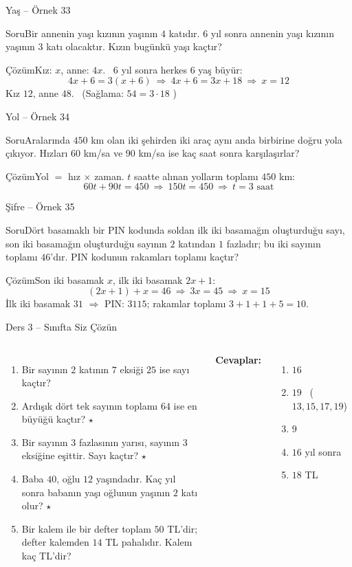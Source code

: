 \documentclass[aspectratio=169,11pt]{beamer}
\newcommand{\soru}[3]{%
\begin{frame}{#1}
  \begin{block}{Soru}\large #2\end{block}
  \pause
  \begin{exampleblock}{Çözüm}\large #3\end{exampleblock}
\end{frame}}
\begin{document}
\soru{Yaş -- Örnek 33}
{Bir annenin yaşı kızının yaşının \(4\) katıdır. \(6\) yıl sonra annenin yaşı kızının yaşının \(3\) katı olacaktır. Kızın bugünkü yaşı kaçtır?}
{Kız: \(x\), anne: \(4x\). \ \(6\) yıl sonra herkes \(6\) yaş büyür:
\[4x+6=3(x+6)\ \Rightarrow\ 4x+6=3x+18\ \Rightarrow\ x=12\]
Kız \(12\), anne \(48\). \ (Sağlama: \(54=3\cdot 18\) \checkmark)}

\soru{Yol -- Örnek 34}
{Aralarında \(450\) km olan iki şehirden iki araç aynı anda birbirine doğru yola çıkıyor. Hızları \(60\) km/sa ve \(90\) km/sa ise kaç saat sonra karşılaşırlar?}
{Yol \(=\) hız \(\times\) zaman. \(t\) saatte alınan yolların toplamı \(450\) km:
\[60t+90t=450\ \Rightarrow\ 150t=450\ \Rightarrow\ t=3 \text{ saat}\]}

\soru{Şifre -- Örnek 35}
{Dört basamaklı bir PIN kodunda soldan ilk iki basamağın oluşturduğu sayı, son iki basamağın oluşturduğu sayının \(2\) katından \(1\) fazladır; bu iki sayının toplamı \(46\)'dır. PIN kodunun rakamları toplamı kaçtır?}
{Son iki basamak \(x\), ilk iki basamak \(2x+1\):
\[(2x+1)+x=46\ \Rightarrow\ 3x=45\ \Rightarrow\ x=15\]
İlk iki basamak \(31\) \(\Rightarrow\) PIN: \(3115\); rakamlar toplamı \(3+1+1+5=10\).}

\begin{frame}{Ders 3 -- Sınıfta Siz Çözün}
\begin{columns}[t]
\begin{enumerate}
\item Bir sayının \(2\) katının \(7\) eksiği \(25\) ise sayı kaçtır?
\item Ardışık dört tek sayının toplamı \(64\) ise en büyüğü kaçtır? \(\star\)
\item Bir sayının \(3\) fazlasının yarısı, sayının \(3\) eksiğine eşittir. Sayı kaçtır? \(\star\)
\item Baba \(40\), oğlu \(12\) yaşındadır. Kaç yıl sonra babanın yaşı oğlunun yaşının \(2\) katı olur? \(\star\)
\item Bir kalem ile bir defter toplam \(50\) TL'dir; defter kalemden \(14\) TL pahalıdır. Kalem kaç TL'dir?
\end{enumerate}
\pause
\textbf{Cevaplar:}
\begin{enumerate}
\item \(16\)\\[8pt]
\item \(19\) \ (\(13,15,17,19\))\\[8pt]
\item \(9\)\\[8pt]
\item \(16\) yıl sonra\\[8pt]
\item \(18\) TL
\end{enumerate}
\end{columns}
\vspace{4pt}{\footnotesize \(\star\) işaretli soruların adım adım çözümü sonraki slaytlardadır.}
\end{frame}
\end{document}
